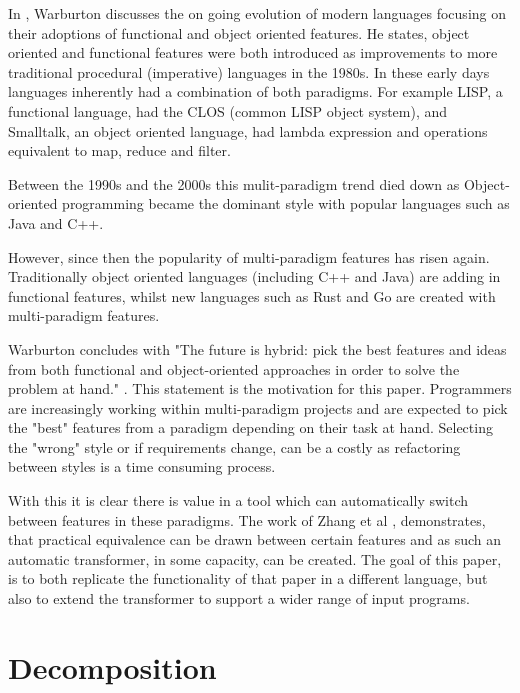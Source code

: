 \documentclass[ oneside,%
                    author={James Elgar},
                    degree={MEng},
                     title={Bidirectional transformer between functional and \\ object-oriented programming in Rust},
                  subtitle={}]{dissertation}
\newcommand{\weixin}{Zhang et al }
\begin{document}
In \cite{warburton}, Warburton discusses the on going evolution of modern languages focusing on their adoptions of functional and object oriented features. He states, object oriented and functional features were both introduced as improvements to more traditional procedural (imperative) languages in the 1980s. In these early days languages inherently had a combination of both paradigms. For example LISP, a functional language, had the CLOS (common LISP object system), and Smalltalk, an object oriented language, had lambda expression and operations equivalent to map, reduce and filter.

Between the 1990s and the 2000s this mulit-paradigm trend died down as Object-oriented programming became the dominant style with popular languages such as Java and C++.

However, since then the popularity of multi-paradigm features has risen again. Traditionally object oriented languages (including C++ and Java) are adding in functional features, whilst new languages such as Rust and Go are created with multi-paradigm features.

Warburton concludes with "The future is hybrid: pick the best features and ideas from both
functional and object-oriented approaches in order to solve the
problem at hand." \cite{warburton}. This statement is the motivation for this paper. Programmers are increasingly working within multi-paradigm projects and are expected to pick the "best" features from a paradigm depending on their task at hand. Selecting the "wrong" style or if requirements change, can be a costly as refactoring between styles is a time consuming process.

With this it is clear there is value in a tool which can automatically switch between features in these paradigms. The work of \weixin \cite{food}, demonstrates, that practical equivalence can be drawn between certain features and as such an automatic transformer, in some capacity, can be created. The goal of this paper, is to both replicate the functionality of that paper in a different language, but also to extend the transformer to support a wider range of input programs.

\section{Decomposition}

\end{document}
